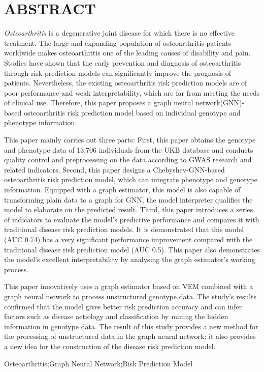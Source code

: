\titlespacing{\chapter}{0pt}{0mm}{5mm}
\chapter*{ABSTRACT}

\textit{Osteoarthritis} is a degenerative joint disease for which there is no effective treatment. The large and expanding population of osteoarthritis patients worldwide makes osteoarthritis one of the leading causes of disability and pain. Studies have shown that the early prevention and diagnosis of osteoarthritis through risk prediction models can significantly improve the prognosis of patients. Nevertheless, the existing osteoarthritis risk prediction models are of poor performance and weak interpretability, which are far from meeting the needs of clinical use. Therefore, this paper proposes a graph neural network(GNN)-based osteoarthritis risk prediction model based on individual genotype and phenotype information.



This paper mainly carries out three parts: First, this paper obtains the genotype and phenotype data of 13,706 individuals from the UKB database and conducts quality control and preprocessing on the data according to GWAS research and related indicators. 
Second, this paper designs a Chebyshev-GNN-based osteoarthritis risk prediction model, which can integrate phenotype and genotype information. Equipped with a graph estimator, this model is 
also capable of transforming plain data to a graph for GNN, the model interpreter qualifies the model to elaborate on the predicted result. 
Third, this paper introduces a series of indicators to evaluate the model's predictive performance and compares it with traditional disease risk prediction models. It is demonstrated that this model (AUC 0.74) has a very significant performance improvement compared with the traditional disease risk prediction model (AUC 0.5). This paper also demonstrates the model's excellent interpretability by analysing the graph estimator's working process.



This paper innovatively uses a graph estimator based on VEM combined with a graph neural network to process unstructured genotype data. The study's results confirmed that the model gives better risk prediction accuracy and can infer factors such as disease aetiology and classification by mining the hidden information in genotype data. The result of this study provides a new method for the processing of unstructured data in the graph neural network; it also provides a new idea for the construction of the disease risk prediction model.

\vspace{\baselineskip}
 Osteoarthritis;Graph Neural Network;Risk Prediction Model


\titlespacing{\chapter}{0pt}{-6mm}{5mm}
\clearpage{\pagestyle{empty}\cleardoublepage}
